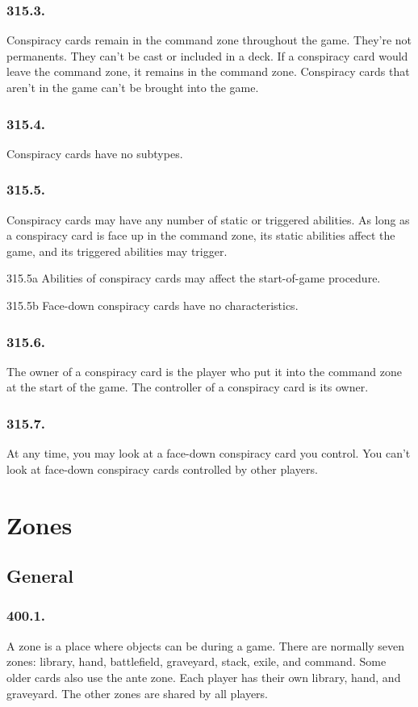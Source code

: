 \subsection*{315.3.}
Conspiracy cards remain in the command zone throughout the game. They’re not permanents. They can’t be cast or included in a deck. If a conspiracy card would leave the command zone, it remains in the command zone. Conspiracy cards that aren’t in the game can’t be brought into the game.

\subsection*{315.4.}
Conspiracy cards have no subtypes.

\subsection*{315.5.}
Conspiracy cards may have any number of static or triggered abilities. As long as a conspiracy card is face up in the command zone, its static abilities affect the game, and its triggered abilities may trigger.

315.5a Abilities of conspiracy cards may affect the start-of-game procedure.

315.5b Face-down conspiracy cards have no characteristics.

\subsection*{315.6.}
The owner of a conspiracy card is the player who put it into the command zone at the start of the game. The controller of a conspiracy card is its owner.

\subsection*{315.7.}
At any time, you may look at a face-down conspiracy card you control. You can’t look at face-down conspiracy cards controlled by other players.

\chapter{Zones}
\setcounter{section}{399}
\section{General}
\subsection*{400.1.}
A zone is a place where objects can be during a game. There are normally seven zones: library, hand, battlefield, graveyard, stack, exile, and command. Some older cards also use the ante zone. Each player has their own library, hand, and graveyard. The other zones are shared by all players.

